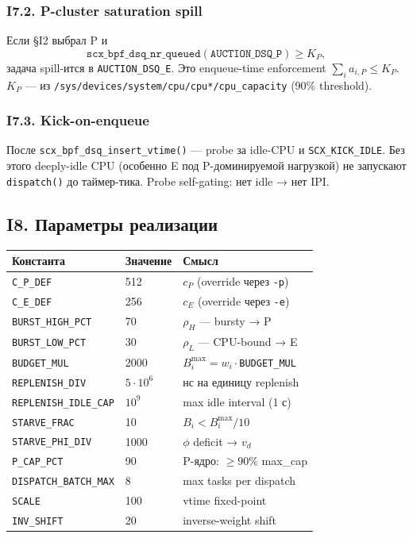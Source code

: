 \documentclass[11pt,a4paper]{article}
\begin{document}
\subsubsection*{I7.2. P-cluster saturation spill}
Если §I2 выбрал P и
\[
\mathtt{scx\_bpf\_dsq\_nr\_queued}(\mathtt{AUCTION\_DSQ\_P})\geq K_P,
\]
задача spill-ится в \texttt{AUCTION\_DSQ\_E}. Это enqueue-time
enforcement $\sum_i a_{i,P}\leq K_P$. $K_P$ — из
\texttt{/sys/devices/system/cpu/cpu*/cpu\_capacity} (90\% threshold).

\subsubsection*{I7.3. Kick-on-enqueue}
После \texttt{scx\_bpf\_dsq\_insert\_vtime()} — probe за idle-CPU
и \texttt{SCX\_KICK\_IDLE}. Без этого deeply-idle CPU (особенно E под
P-доминируемой нагрузкой) не запускают \texttt{dispatch()} до
таймер-тика. Probe self-gating: нет idle → нет IPI.

\subsection{I8. Параметры реализации}

\begin{center}\small
\begin{tabular}{@{}lll@{}}
\toprule
Константа & Значение & Смысл\\
\midrule
\texttt{C\_P\_DEF}        & 512 & $c_P$ (override через \texttt{-p})\\
\texttt{C\_E\_DEF}        & 256 & $c_E$ (override через \texttt{-e})\\
\texttt{BURST\_HIGH\_PCT} & 70  & $\rho_H$ — bursty → P\\
\texttt{BURST\_LOW\_PCT}  & 30  & $\rho_L$ — CPU-bound → E\\
\texttt{BUDGET\_MUL}      & 2000 & $B_i^{\max}=w_i\cdot$\texttt{BUDGET\_MUL}\\
\texttt{REPLENISH\_DIV}   & $5\cdot 10^6$ & нс на единицу replenish\\
\texttt{REPLENISH\_IDLE\_CAP}& $10^9$ & max idle interval (1 с)\\
\texttt{STARVE\_FRAC}     & 10  & $B_i<B_i^{\max}/10$\\
\texttt{STARVE\_PHI\_DIV} & 1000 & $\phi$ deficit → $v_d$\\
\texttt{P\_CAP\_PCT}      & 90  & P-ядро: $\geq 90\%$ max\_cap\\
\texttt{DISPATCH\_BATCH\_MAX}& 8 & max tasks per dispatch\\
\texttt{SCALE}            & 100 & vtime fixed-point\\
\texttt{INV\_SHIFT}       & 20  & inverse-weight shift\\
\bottomrule
\end{tabular}
\end{center}
\end{document}
